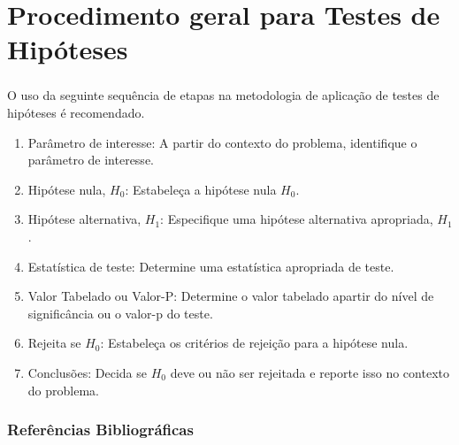 \documentclass[14pt,aspectratio=1610]{beamer}
\newcommand{\Ho}{\ensuremath{H_{0}}}
\newcommand{\Hi}{\ensuremath{H_{1}}}
\begin{document}
\section{Procedimento geral para Testes de Hipóteses}
\begin{frame}{}
\frametitle{}
\begin{block}{}
\justifying
O uso da seguinte sequência de etapas na metodologia de aplicação de testes de hipóteses é recomendado.
\begin{enumerate}
\item Parâmetro de interesse: A partir do contexto do problema, identifique o parâmetro de interesse.\pause
\item Hipótese nula, $\Ho$: Estabeleça a hipótese nula $\Ho$. \pause
\item Hipótese alternativa, $\Hi$: Especifique uma hipótese alternativa apropriada, $\Hi$.\pause
\item Estatística de teste: Determine uma estatística apropriada de teste.\pause
\item Valor Tabelado ou Valor-P: Determine o valor tabelado apartir do nível de significância ou o valor-p do teste.\pause
\item Rejeita se $\Ho$: Estabeleça os critérios de rejeição para a hipótese nula.\pause
\item Conclusões: Decida se $\Ho$ deve ou não ser rejeitada e reporte isso no contexto do problema.
\end{enumerate}
\nocite{roteiro}
\end{block}
\end{frame}

\begin{frame}{}
\frametitle{Referências Bibliográficas}

\end{frame}
\end{document}
